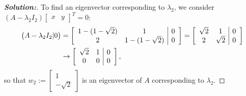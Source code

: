 \documentclass[a4paper]{amsart}
\theoremstyle{definition}
\newenvironment{solution}{\begin{proof}[\textbf{Solution:}] \vphantom{u}}{\end{proof}}
\begin{document}
\begin{solution}
 To find an eigenvector corresponding to $\lambda_2$, we consider
 $(A - \lambda_2I_2)\left[
 \begin{array}{cc}x & y
 \end{array} \right]^T = 0$:
 \begin{align*}
 \big(A - \lambda_2I_2|0\big) &= \left[ \begin{array}{cc|c} 1 -
 (\textstyle 1-\sqrt{2}) & 1& 0\\ 2 & 1-(\textstyle 1-\sqrt{2}) & 0\end{array} \right] = \left[
 \begin{array}{cc|c} \sqrt{2} & 1 & 0\\ 2 & \sqrt{2} & 0
 \end{array} \right]\\ & \to \left[ \begin{array}{cc|c}
  \sqrt{2} & 1 & 0\\0 & 0 & 0
 \end{array} \right],
 \end{align*}
 so that $w_2 := \left[ \begin{array}{c}1\\ -\sqrt{2}
 \end{array} \right]$ is an eigenvector of $A$ corresponding to
 $\lambda_2$.


\end{solution}
\end{document}
